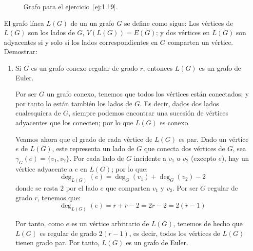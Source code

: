 \begin{ejercicio}
\begin{figure}
        
        
        \caption{Grafo para el ejercicio~\ref{ej:1.19}.}
        \label{fig:1.19}
    \end{figure}

\end{ejercicio}

\begin{ejercicio}\label{ej:1.20}
    El grafo línea $L(G)$ de un un grafo $G$ se define como sigue: Los vértices de $L(G)$ son los lados de $G$, $V(L(G)) = E(G)$; y dos vértices en $L(G)$ son adyacentes si y solo si los lados correspondientes en $G$ comparten un vértice. Demostrar:
    \begin{enumerate}
        \item Si $G$ es un grafo conexo regular de grado $r$, entonces $L(G)$ es un grafo de Euler.
        
        Por ser $G$ un grafo conexo, tenemos que todos los vértices están conectados; y por tanto lo están también los lados de $G$. Es decir, dados dos lados cualesquiera de $G$, siempre podemos encontrar una sucesión de vértices adyacentes que los conecten; por lo que $L(G)$ es conexo.
        
        Veamos ahora que el grado de cada vértice de $L(G)$ es par. Dado un vértice $e$ de $L(G)$, este representa un lado de $G$ que conecta dos vértices de $G$, sea $\gamma_G(e)=\{v_1,v_2\}$. Por cada lado de $G$ incidente a $v_1$ o $v_2$ (excepto $e$), hay un vértice adyacente a $e$ en $L(G)$; por lo que:
        \begin{equation*}
            \deg_{L(G)}(e) = \deg_G(v_1) + \deg_G(v_2)-2
        \end{equation*}
        donde se resta $2$ por el lado $e$ que comparten $v_1$ y $v_2$. Por ser $G$ regular de grado $r$, tenemos que:
        \begin{equation*}
            \deg_{L(G)}(e) = r+r-2 = 2r-2=2(r-1)
        \end{equation*}

        Por tanto, como $e$ es un vértice arbitrario de $L(G)$, tenemos de hecho que $L(G)$ es regular de grado $2(r-1)$, es decir, todos los vértices de $L(G)$ tienen grado par. Por tanto, $L(G)$ es un grafo de Euler.
        

\end{enumerate}
\end{ejercicio}
